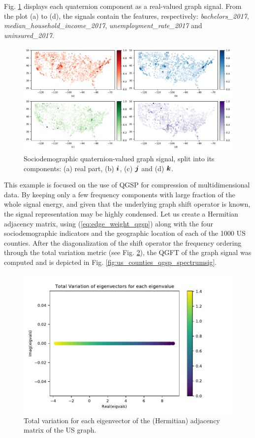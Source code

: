 Fig. \ref{fig:us_signal} displays each quaternion component as a real-valued graph signal. From the plot (a) to (d), the signals contain the features, respectively: \textit{bachelors\_2017}, \textit{median\_\-household\_\-income\_2017}, \textit{unemployment\_rate\_2017} and \textit{uninsured\_2017}.

\begin{figure}
\centering
\includegraphics[width=0.95\linewidth]{thesis/Figures/usa_example/us_signal.pdf}
\caption{Sociodemographic quaternion-valued graph signal, split into its components: (a) real part, (b) $\boldsymbol{i}$, (c) $\boldsymbol{j}$ and (d) $\boldsymbol{k}$.}
\label{fig:us_signal}
\end{figure}

This example is focused on the use of QGSP for compression of multidimensional data. By keeping only a few frequency components with large fraction of the whole signal energy, and given that the underlying graph shift operator is known, the signal representation may be highly condensed. Let us create a Hermitian adjacency matrix, using (\ref{eq:edge_weight_qgsp}) along with the four sociodemographic indicators and the geographic location of each of the 1000 US counties. After the diagonalization of the shift operator the frequency ordering through the total variation metric (see Fig. \ref{fig:us_counties_qgsp_tv1}), the QGFT of the graph signal was computed and is depicted in Fig. \ref{fig:us_counties_qgsp_spectrumsig}.

\renewcommand{\floatpagefraction}{.8}%
\begin{figure}
\centering
\includegraphics[width=0.65\linewidth]{thesis/Figures/usa_example/us_counties_qgsp_tv1.pdf}
\caption{Total variation for each eigenvector of the (Hermitian) adjacency matrix of the US graph.}
\label{fig:us_counties_qgsp_tv1}
\end{figure}


